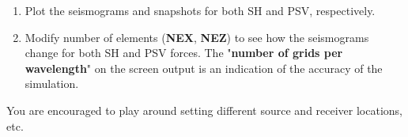 \documentclass[11pt,titlepage,fleqn]{article}
\begin{document}
\begin{enumerate}

\item Plot the seismograms and snapshots for both SH and PSV, respectively.

\item Modify number of elements ({\bf NEX}, {\bf NEZ}) to see how the seismograms change for both SH and
PSV forces. The "{\bf number of grids per wavelength}" on the screen output is an indication of the accuracy of the simulation.
        
\end{enumerate}

You are encouraged to play around setting different source and receiver locations, etc.
\end{document}
